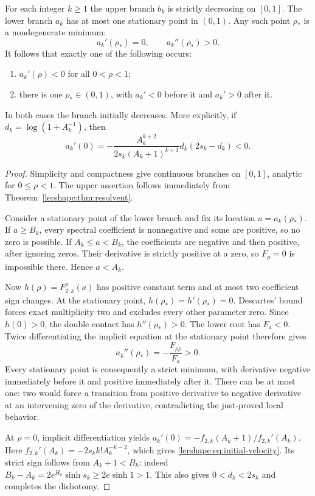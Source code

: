 \begin{theorem}
\label{lershape:thm:dichotomy}
For each integer $k\geq1$ the upper branch $b_k$ is strictly decreasing
on $[0,1]$. The lower branch $a_k$ has at most one stationary point in
$(0,1)$. Any such point $\rho_*$ is a nondegenerate minimum:
\[
 a_k'(\rho_*)=0,\qquad a_k''(\rho_*)>0.
\]
It follows that exactly one of the following occurs:
\begin{enumerate}
\item $a_k'(\rho)<0$ for all $0<\rho<1$;
\item there is one $\rho_*\in(0,1)$, with $a_k'<0$ before it and
      $a_k'>0$ after it.
\end{enumerate}
In both cases the branch initially decreases. More explicitly, if
$d_k=\log(1+A_k^{-1})$, then
\begin{equation}\label{lershape:eq:initial-velocity}
 a_k'(0)=-\frac{A_k^{k+2}}{2s_k(A_k+1)^{k+1}}
                 d_k(2s_k-d_k)<0.
\end{equation}
\end{theorem}

\begin{proof}
Simplicity and compactness give continuous branches on $[0,1]$, analytic
for $0\leq\rho<1$. The upper assertion follows immediately from
Theorem~\ref{lershape:thm:resolvent}.

Consider a stationary point of the lower branch and fix its location
$a=a_k(\rho_*)$. If $a\geq B_k$, every spectral coefficient is
nonnegative and some are positive, so no zero is possible. If
$A_k\leq a<B_k$, the coefficients are negative and then positive,
after ignoring zeros. Their derivative is strictly positive at a zero,
so $F_\rho=0$ is impossible there. Hence $a<A_k$.

Now $h(\rho)=F_{2,k}^{\rho}(a)$ has positive constant term and at
most two coefficient sign changes. At the stationary point,
$h(\rho_*)=h'(\rho_*)=0$. Descartes' bound forces exact multiplicity
two and excludes every other parameter zero. Since $h(0)>0$, the
double contact has $h''(\rho_*)>0$. The lower root has $F_a<0$.
Twice differentiating the implicit equation at the stationary point
therefore gives
\[
 a_k''(\rho_*)=-\frac{F_{\rho\rho}}{F_a}>0.
\]
Every stationary point is consequently a strict minimum, with derivative
negative immediately before it and positive immediately after it.
There can be at most one: two would force a transition from positive
derivative to negative derivative at an intervening zero of the
derivative, contradicting the just-proved local behavior.

At $\rho=0$, implicit differentiation yields
$a_k'(0)=-f_{2,k}(A_k+1)/f_{2,k}'(A_k)$. Here
$f_{2,k}'(A_k)=-2s_k k!A_k^{-k-2}$, which gives
\eqref{lershape:eq:initial-velocity}. Its strict sign follows from
$A_k+1<B_k$: indeed
$B_k-A_k=2e^{H_k}\sinh s_k\geq2e\sinh1>1$.
This also gives $0<d_k<2s_k$ and completes the dichotomy.
\end{proof}

